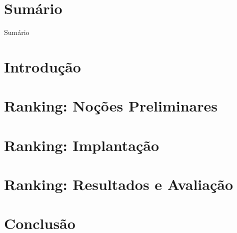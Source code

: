 \documentclass{beamer}
\begin{document}
\section{Sumário}
\begin{frame}
    Sumário
\end{frame}

\section{Introdução}


\section{Ranking: Noções Preliminares}


\section{Ranking: Implantação}


\section{Ranking: Resultados e Avaliação}


\section{Conclusão}


\begin{frame}
    
\end{frame}
\end{document}
